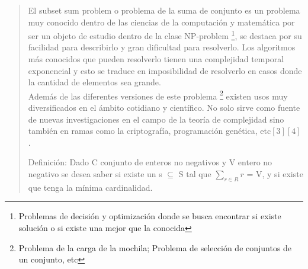\documentclass[7pt,a4paper]{article}
\begin{document}
\begin{verse}
	El subset sum problem o problema de la suma de conjunto es un problema muy conocido dentro de las ciencias de la computación y matemática por ser un objeto de estudio dentro de la clase  NP-problem \footnote{Problemas de decisión y optimización donde se busca encontrar si existe solución o si existe una mejor que la conocida}, se destaca por su facilidad para describirlo y gran dificultad para resolverlo. Los algoritmos más conocidos que pueden resolverlo tienen una complejidad temporal exponencial y esto se traduce en imposibilidad de resolverlo en casos donde la cantidad de elementos sea grande. \\
Además de las diferentes versiones de este problema \footnote{Problema de la carga de la mochila; Problema de selección de conjuntos de un conjunto, etc} existen usos muy diversificados en el ámbito cotidiano y científico. No solo sirve como fuente de nuevas investigaciones en el campo de la teoría de complejidad sino también en ramas como la criptografía, programación genética, etc$[3][4]$. %

\bigskip
	Definición: Dado C conjunto de enteros no negativos y V entero no negativo se desea saber si existe un s $\subseteq$ S tal que $\sum_{r \in R}r$ = V, y si existe que tenga la mínima cardinalidad.
	

\end{verse}
\end{document}
